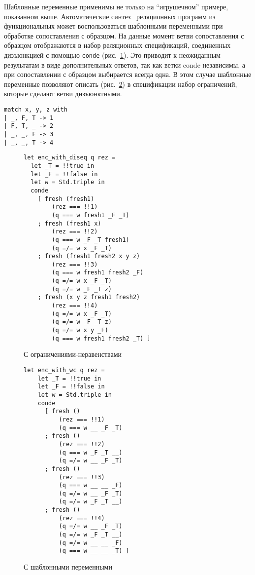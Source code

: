 Шаблонные переменные применимы не только на \enquote{игрушечном} примере, показанном выше.
Автоматические синтез~\cite{Lozov2018} реляционных программ из функциональных может воспользоваться шаблонными переменными при обработке сопоставления с образцом.
На данные момент ветви сопоставления с образцом отображаются в набор реляционных спецификаций, соединенных дизъюнкцией с помощью \verb=conde= (рис.~\ref{fig:matching-example3}).
Это приводит к неожиданным результатам в виде дополнительных ответов, так как ветки conde независимы, а при сопоставлении с образцом выбирается всегда одна.
В этом случае шаблонные переменные позволяют описать (рис.~\ref{fig:matching-example4}) в спецификации набор ограничений, которые сделают ветви дизъюнктными.


\begin{figure*}[t]
  \centering
  \renewcommand\thesubfigure{\alph{subfigure}1}
  \begin{lstlisting}
match x, y, z with
| _, F, T -> 1
| F, T, _ -> 2
| _, _, F -> 3
| _, _, T -> 4
  \end{lstlisting}
  \vskip4.5mm
  \caption{Пример сопоставления с обрацом в языке OCaml}
  \label{fig:matching-example1}
\end{figure*}

\begin{figure*}[t]
\begin{subfigure}{0.49\textwidth}
\begin{lstlisting}
let enc_with_diseq q rez =
  let _T = !!true in
  let _F = !!false in
  let w = Std.triple in
  conde
    [ fresh (fresh1)
        (rez === !!1)
        (q === w fresh1 _F _T)
    ; fresh (fresh1 x)
        (rez === !!2)
        (q === w _F _T fresh1)
        (q =/= w x _F _T)
    ; fresh (fresh1 fresh2 x y z)
        (rez === !!3)
        (q === w fresh1 fresh2 _F)
        (q =/= w x _F _T)
        (q =/= w _F _T z)
    ; fresh (x y z fresh1 fresh2)
        (rez === !!4)
        (q =/= w x _F _T)
        (q =/= w _F _T z)
        (q =/= w x y _F)
        (q === w fresh1 fresh2 _T) ]
\end{lstlisting}
\caption{С ограничениями-неравенствами}
\label{fig:matching-example3}
\end{subfigure}
\begin{subfigure}{0.49\textwidth}
\begin{lstlisting}
let enc_with_wc q rez =
    let _T = !!true in
    let _F = !!false in
    let w = Std.triple in
    conde
      [ fresh ()
          (rez === !!1)
          (q === w __ _F _T)
      ; fresh ()
          (rez === !!2)
          (q === w _F _T __)
          (q =/= w __ _F _T)
      ; fresh ()
          (rez === !!3)
          (q === w __ __ _F)
          (q =/= w __ _F _T)
          (q =/= w _F _T __)
      ; fresh ()
          (rez === !!4)
          (q =/= w __ _F _T)
          (q =/= w _F _T __)
          (q =/= w __ __ _F)
          (q === w __ __ _T) ]
\end{lstlisting}
\caption{С шаблонными переменными}
\label{fig:matching-example4}
\end{subfigure}
\caption{Две возможноые трансляции примера с Рис.~\ref{fig:match-example1}}
\label{fig:maranget-example-compilation}
\end{figure*}


